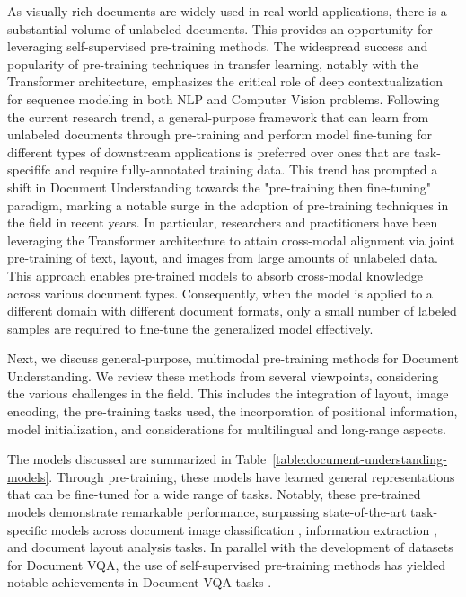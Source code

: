 As visually-rich documents are widely used in real-world applications, there is a substantial volume of unlabeled documents. This provides an opportunity for leveraging self-supervised pre-training methods. The widespread success and popularity of pre-training techniques in transfer learning, notably with the Transformer architecture, emphasizes the critical role of deep contextualization for sequence modeling in both \ac{NLP} and Computer Vision problems. Following the current research trend, a general-purpose framework that can learn from unlabeled documents through pre-training and perform model fine-tuning for different types of downstream applications is preferred over ones that are task-specififc and require fully-annotated training data. This trend has prompted a shift in Document Understanding towards the "pre-training then fine-tuning" paradigm, marking a notable surge in the adoption of pre-training techniques in the field in recent years. In particular, researchers and practitioners have been leveraging the Transformer architecture to attain cross-modal alignment via joint pre-training of text, layout, and images from large amounts of unlabeled data. This approach enables pre-trained models to absorb cross-modal knowledge across various document types. Consequently, when the model is applied to a different domain with different document formats, only a small number of labeled samples are required to fine-tune the generalized model effectively. 

Next, we discuss general-purpose, multimodal pre-training methods for Document Understanding. We review these methods from several viewpoints, considering the various challenges in the field. This includes the integration of layout, image encoding, the pre-training tasks used, the incorporation of positional information, model initialization, and considerations for multilingual and long-range aspects. 

The models discussed are summarized in Table~\ref{table:document-understanding-models}. Through pre-training, these models have learned general representations that can be fine-tuned for a wide range of tasks. Notably, these pre-trained models demonstrate remarkable performance, surpassing state-of-the-art task-specific models across document image classification \citep{xu2020layoutlmv2}, information extraction \citep{peng2022ernie}, and document layout analysis \citep{li2020docbank} tasks. In parallel with the development of datasets for {Document VQA}, the use of self-supervised pre-training methods has yielded notable achievements in {Document VQA} tasks \citep{appalaraju2021docformer, tanaka2021visualmrc}. 

